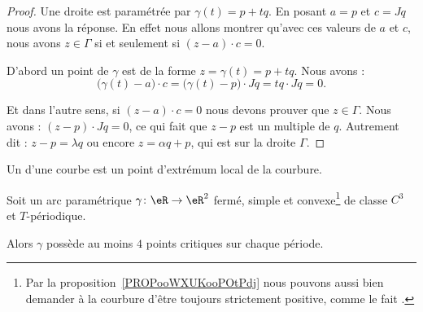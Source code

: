 \begin{proof}
	Une droite est paramétrée par \( \gamma(t)=p+tq\). En posant \( a=p\) et \( c=Jq\) nous avons la réponse. En effet nous allons montrer qu'avec ces valeurs de \( a\) et \( c\), nous avons \( z\in \Gamma\) si et seulement si \( (z-a)\cdot c=0\).

	D'abord un point de \( \gamma\) est de la forme \( z=\gamma(t)=p+tq\). Nous avons :
	\begin{equation}
		\big( \gamma(t)-a \big)\cdot c=\big( \gamma(t)-p \big)\cdot Jq=tq\cdot Jq=0.
	\end{equation}

	Et dans l'autre sens, si \( (z-a)\cdot c=0\) nous devons prouver que \( z\in \Gamma\). Nous avons : \( (z-p)\cdot Jq=0\), ce qui fait que \( z-p\) est un multiple de \( q\). Autrement dit : \( z-p=\lambda q\) ou encore \( z=\alpha q+p\), qui est sur la droite \( \Gamma\).
\end{proof}

\begin{definition}
	Un  d'une courbe est un point d'extrémum local de la courbure.
\end{definition}

\begin{theorem}       \label{THOooFRBBooWKZcfY}
	Soit un arc paramétrique \( \gamma\colon \eR\to \eR^2\) fermé, simple et convexe\footnote{Par la proposition~\ref{PROPooWXUKooPOtPdj} nous pouvons aussi bien demander à la courbure d'être toujours strictement positive, comme le fait \cite{KXjFWKA}.} de classe \( C^3\) et \( T\)-périodique.

	Alors \( \gamma\) possède au moins \( 4\) points critiques sur chaque période.
\end{theorem}

